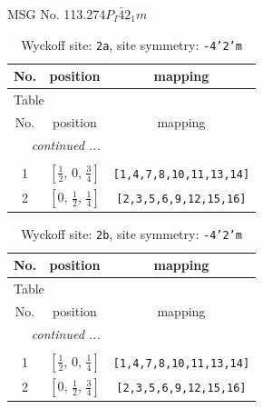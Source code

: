 \documentclass[fleqn,8pt]{jsarticle}
\begin{document}
\setcounter{MaxMatrixCols}{32}

\renewcommand{\tablename}{Table~}
\renewcommand{\figurename}{Figure~}
\begin{center}
\LARGE
MSG No. 113.274\quad$P_{I}\bar{4}2_{1}m$
\end{center}
\renewcommand{\arraystretch}{1.2}
\begin{longtable}{ccc}
\caption{Wyckoff site: {\tt 2a}, site symmetry: {\tt -4'2'm}}
 \\
 \hline \hline
No. & position & mapping \\ \hline \endfirsthead

\multicolumn{2}{l}{\tablename\ \thetable{}} \\
 \hline \hline
No. & position & mapping \\ \hline \endhead

 \hline \hline
\multicolumn{2}{r}{\footnotesize\it continued ...} \\ \endfoot

 \hline \hline
\multicolumn{2}{r}{} \\ \endlastfoot

1 & $\left[ \frac{1}{2},\, 0,\, \frac{3}{4} \right]$ & {\tt [1,4,7,8,10,11,13,14]} \\ \hline
2 & $\left[ 0,\, \frac{1}{2},\, \frac{1}{4} \right]$ & {\tt [2,3,5,6,9,12,15,16]} \\
\end{longtable}
\renewcommand{\arraystretch}{1.2}
\begin{longtable}{ccc}
\caption{Wyckoff site: {\tt 2b}, site symmetry: {\tt -4'2'm}}
 \\
 \hline \hline
No. & position & mapping \\ \hline \endfirsthead

\multicolumn{2}{l}{\tablename\ \thetable{}} \\
 \hline \hline
No. & position & mapping \\ \hline \endhead

 \hline \hline
\multicolumn{2}{r}{\footnotesize\it continued ...} \\ \endfoot

 \hline \hline
\multicolumn{2}{r}{} \\ \endlastfoot

1 & $\left[ \frac{1}{2},\, 0,\, \frac{1}{4} \right]$ & {\tt [1,4,7,8,10,11,13,14]} \\ \hline
2 & $\left[ 0,\, \frac{1}{2},\, \frac{3}{4} \right]$ & {\tt [2,3,5,6,9,12,15,16]} \\
\end{longtable}
\end{document}
